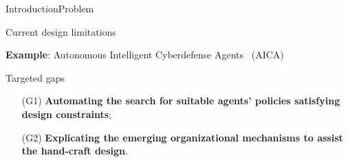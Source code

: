 \begin{frame}{Introduction}{Problem}
\begin{alertblock}{Current design limitations}
\begin{center}
\begin{minipage}{0.95\linewidth}
\begin{exampleblock}{\textbf{Example}: Autonomous Intelligent Cyberdefense Agents~\cite{Kott2023} (AICA)}
                \end{exampleblock}
            \end{minipage}
        \end{center}

    \end{alertblock}

    \begin{alertblock}{Targeted gaps}
        \begin{enumerate}
            \item[\phantom{X} (G1)] \textbf{Automating the search for suitable agents' policies satisfying design constraints};
            \item[\phantom{X} (G2)] \textbf{Explicating the emerging organizational mechanisms to assist the hand-craft design}.
        \end{enumerate}
    \end{alertblock}

\end{frame}
